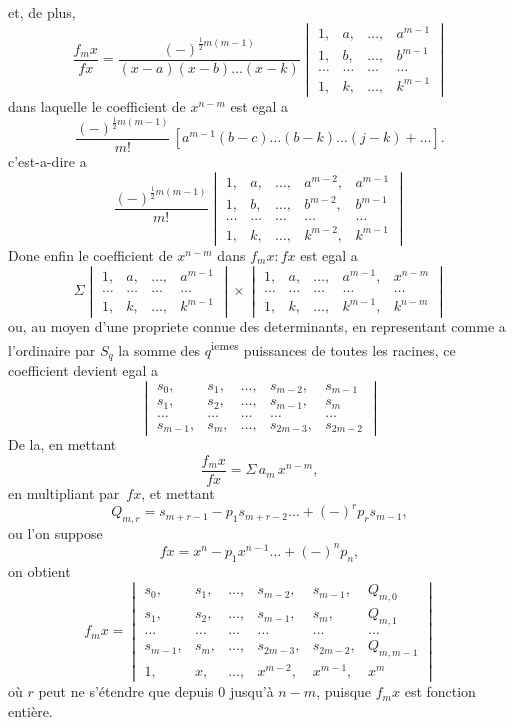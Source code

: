 \documentclass[11pt,a4paper]{article}
\begin{document}
\newpage
et, de plus,
\[
\frac{f_m x}{fx} = \frac{(-)^{\frac{1}{2}m(m-1)}}{(x-a)(x-b)\ldots(x-k)} \begin{vmatrix}
1, & a, & \ldots, & a^{m-1}\\
1, & b, & \ldots, & b^{m-1}\\
\ldots & \ldots & \ldots & \ldots\\
1, & k, & \ldots, & k^{m-1}
\end{vmatrix}
\]
dans laquelle le coefficient de $x^{n-m}$ est egal a
\[
\frac{(-)^{\frac{1}{2}m(m-1)}}{m!}\,[a^{m-1}(b-c)\ldots(b-k)\ldots(j-k) + \ldots].
\]
c'est-a-dire a
\[
\frac{(-)^{\frac{1}{2}m(m-1)}}{m!} \begin{vmatrix}
1, & a, & \ldots, & a^{m-2}, & a^{m-1}\\
1, & b, & \ldots, & b^{m-2}, & b^{m-1}\\
\ldots & \ldots & \ldots & \ldots & \ldots\\
1, & k, & \ldots, & k^{m-2}, & k^{m-1}
\end{vmatrix}
\]
Done enfin le coefficient de $x^{n-m}$ dans $f_m x : fx$ est egal a
\[
\Sigma \begin{vmatrix}
1, & a, & \ldots, & a^{m-1}\\
\ldots & \ldots & \ldots & \ldots\\
1, & k, & \ldots, & k^{m-1}
\end{vmatrix} \times \begin{vmatrix}
1, & a, & \ldots, & a^{m-1}, & x^{n-m}\\
\ldots & \ldots & \ldots & \ldots & \ldots\\
1, & k, & \ldots, & k^{m-1}, & k^{n-m}
\end{vmatrix}
\]
ou, au moyen d'une propriete connue des determinants, en representant comme a l'ordinaire par $S_q$ la somme des $q$\textsuperscript{iemes} puissances de toutes les racines, ce coefficient devient egal a
\[
\begin{vmatrix}
s_0, & s_1, & \ldots, & s_{m-2}, & s_{m-1}\\
s_1, & s_2, & \ldots, & s_{m-1}, & s_m\\
\ldots & \ldots & \ldots & \ldots & \ldots\\
s_{m-1}, & s_m, & \ldots, & s_{2m-3}, & s_{2m-2}
\end{vmatrix}
\]
De la, en mettant
\[
\frac{f_m x}{fx} = \Sigma \, a_m \, x^{n-m},
\]
en multipliant par~$fx$, et mettant
\[
Q_{m,r} = s_{m+r-1} - p_1 s_{m+r-2} \ldots + (-)^r p_r s_{m-1},
\]
ou l'on suppose
\[
fx = x^n - p_1 x^{n-1} \ldots + (-)^n p_n,
\]
on obtient
\[
f_m x = \begin{vmatrix}
s_0, & s_1, & \ldots, & s_{m-2}, & s_{m-1}, & Q_{m,0}\\
s_1, & s_2, & \ldots, & s_{m-1}, & s_m, & Q_{m,1}\\
\ldots & \ldots & \ldots & \ldots & \ldots & \ldots\\
s_{m-1}, & s_m, & \ldots, & s_{2m-3}, & s_{2m-2}, & Q_{m,m-1}\\
1, & x, & \ldots, & x^{m-2}, & x^{m-1}, & x^m
\end{vmatrix}
\]
o\`u $r$ peut ne s'\'etendre que depuis $0$ jusqu'\`a $n-m$, puisque $f_m x$ est fonction enti\`ere.
\end{document}
